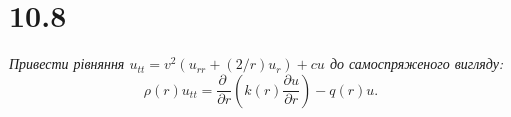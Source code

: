 


%


\section[Задача №10.8]{10.8}

\textit{Привести рівняння $u_{tt} = v^2 (u_{rr} + (2/r) u_r) + cu$ до самоспряженого вигляду: \[\rho(r)u_{tt} = \frac{\partial\;}{\partial r} \left(k(r) \frac{\partial u}{\partial r}\right) - q(r)u.\]}


%